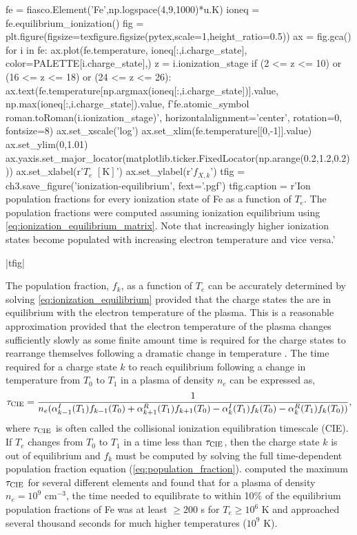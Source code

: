 \begin{pycode}[chapter3]
fe = fiasco.Element('Fe',np.logspace(4,9,1000)*u.K)
ioneq = fe.equilibrium_ionization()
fig = plt.figure(figsize=texfigure.figsize(pytex,scale=1,height_ratio=0.5))
ax = fig.gca()
for i in fe:
    ax.plot(fe.temperature, ioneq[:,i.charge_state],
            color=PALETTE[i.charge_state],)
    z = i.ionization_stage
    if (2 <= z <= 10) or (16 <= z <= 18) or (24 <= z <= 26):
        ax.text(fe.temperature[np.argmax(ioneq[:,i.charge_state])].value,
                np.max(ioneq[:,i.charge_state]).value,
                f'{fe.atomic_symbol} {roman.toRoman(i.ionization_stage)}',
                horizontalalignment='center', rotation=0,
                fontsize=8)
ax.set_xscale('log')
ax.set_xlim(fe.temperature[[0,-1]].value)
ax.set_ylim(0,1.01)
ax.yaxis.set_major_locator(matplotlib.ticker.FixedLocator(np.arange(0.2,1.2,0.2)))
ax.set_xlabel(r'$T_e$ $[\si{\kelvin}]$')
ax.set_ylabel(r'$f_{X,k}$')
tfig = ch3.save_figure('ionization-equilibrium', fext='.pgf')
tfig.caption = r'Ion population fractions for every ionization state of Fe as a function of $T_e$. The population fractions were computed assuming ionization equilibrium using \autoref{eq:ionization_equilibrium_matrix}. Note that increasingly higher ionization states become populated with increasing electron temperature and vice versa.'
\end{pycode}
\py[chapter3]|tfig|

The population fraction, $f_k$, as a function of $T_e$ can be accurately determined by solving \autoref{eq:ionization_equilibrium} provided that the charge states the are in equilibrium with the electron temperature of the plasma. This is a reasonable approximation provided that the electron temperature of the plasma changes sufficiently slowly as some finite amount time is required for the charge states to rearrange themselves following a dramatic change in temperature \citep{bradshaw_collisional_2013}. The time required for a charge state $k$ to reach equilibrium following a change in temperature from $T_0$ to $T_1$ in a plasma of density $n_e$ can be expressed as,
\begin{equation}\label{eq:cie_timescale}
    \tau_\textup{CIE} = \frac{1}{n_e(\alpha_{k-1}^I(T_1) f_{k-1}(T_0) + \alpha_{k+1}^R(T_1) f_{k+1}(T_0) - \alpha_{k}^I(T_1) f_k(T_0) - \alpha_k^R(T_1) f_k(T_0))},
\end{equation}
where $\tau_\textup{CIE}$ is often called the collisional ionization equilibration timescale (CIE). If $T_e$ changes from $T_0$ to $T_1$ in a time less than $\tau_\textup{CIE}$, then the charge state $k$ is out of equilibrium and $f_k$ must be computed by solving the full time-dependent population fraction equation (\autoref{eq:population_fraction}). \citet{smith_ionization_2010} computed the maximum $\tau_\textup{CIE}$ for several different elements and found that for a plasma of density $n_e=10^9$ cm$^{-3}$, the time needed to equilibrate to within 10\% of the equilibrium population fractions of Fe was at least $\ge200$ s for $T_e\ge10^6$ K and approached several thousand seconds for much higher temperatures ($10^9$ K).

